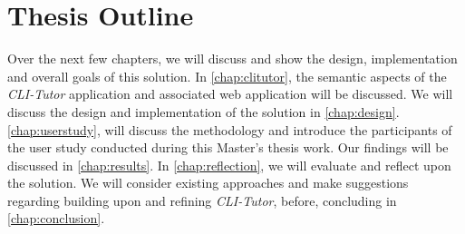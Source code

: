 \section{Thesis Outline}

Over the next few chapters, we will discuss and show the design, implementation
and overall goals of this solution. In \autoref{chap:clitutor}, the semantic
aspects of the \textit{CLI-Tutor} application and associated web application
will be discussed. We will discuss the design and implementation of the
solution in \autoref{chap:design}. \autoref{chap:userstudy}, will discuss the
methodology and introduce the participants of the user study conducted during
this Master's thesis work. Our findings will be discussed in
\autoref{chap:results}. In \autoref{chap:reflection}, we will evaluate and
reflect upon the solution. We will consider existing approaches and make
suggestions regarding building upon and refining \textit{CLI-Tutor}, before,
concluding in \autoref{chap:conclusion}.
